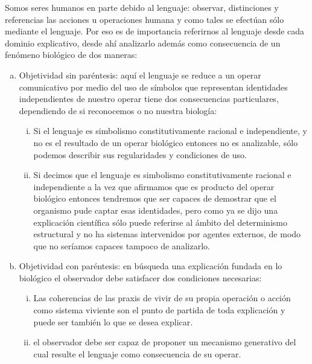 \documentclass[10pt]{article}
\begin{document}
        Somos seres humanos en parte debido al lenguaje: observar, distinciones y referencias las acciones u operaciones humana y como tales se efectúan sólo mediante el lenguaje. Por eso es de importancia referirnos al lenguaje desde cada dominio explicativo, desde ahí analizarlo además como consecuencia de un fenómeno biológico de dos maneras:
        
        \begin{enumerate}[a.]
            \item  Objetividad sin paréntesis: aquí el lenguaje se reduce a un operar comunicativo por medio del uso de símbolos que representan identidades independientes de nuestro operar tiene dos consecuencias particulares, dependiendo de si reconocemos o no nuestra biología:
            
            \begin{enumerate}[i.]
                \item  Si el lenguaje es simbolismo constitutivamente racional e independiente, y no es el resultado de un operar biológico entonces no es analizable, sólo podemos describir sus regularidades y condiciones de uso.
                \item Si decimos que el lenguaje es simbolismo constitutivamente racional e independiente a la vez que afirmamos que es producto del operar biológico entonces tendremos que ser capaces de demostrar que el organismo pude captar esas identidades, pero como ya se dijo una explicación científica sólo puede referirse al ámbito del determinismo estructural y no ha sistemas intervenidos por agentes externos, de modo que no seríamos capaces tampoco de analizarlo.
            \end{enumerate}

            \item Objetividad con paréntesis: en búsqueda una explicación fundada en lo biológico el observador debe satisfacer dos condiciones necesarias:
            
            \begin{enumerate}[i.]
                \item Las coherencias de las praxis de vivir de su propia operación o acción como sistema viviente son el punto de partida de toda explicación y puede ser también lo que se desea explicar.
                \item el observador debe ser capaz de proponer un mecanismo generativo del cual resulte el lenguaje como consecuencia de su operar.
            \end{enumerate}
        \end{enumerate}
       
\end{document}
